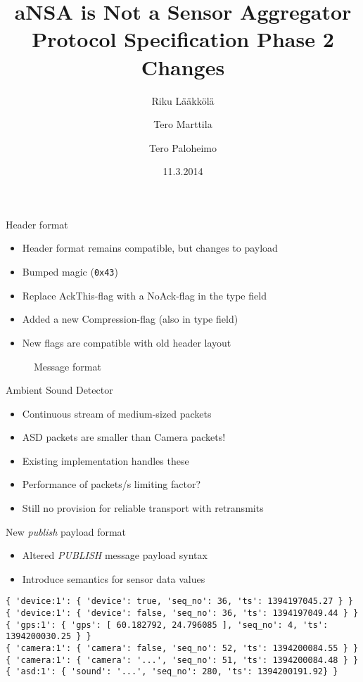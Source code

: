 \documentclass{beamer}
\title[SFO protocol]{aNSA is Not a Sensor Aggregator\\Protocol Specification Phase 2 Changes}
\author{Riku Lääkkölä \and Tero Marttila \and Tero Paloheimo}
\institute{Aalto ELEC}
\date{11.3.2014}
\begin{document}
\begin{frame}
\titlepage
\end{frame}

\begin{frame}{Header format}
\begin{itemize}
	\item Header format remains compatible, but changes to payload
	\item Bumped magic (\texttt{0x43})
	\item Replace AckThis-flag with a NoAck-flag in the type field
	\item Added a new Compression-flag (also in type field)
	\item New flags are compatible with old header layout
\end{itemize}

\begin{figure}
    \begin{center}
        {\tiny }
        \caption{Message format}
        \label{fig:header}
    \end{center}
\end{figure}

\end{frame}

\begin{frame}{Ambient Sound Detector}
\begin{itemize}
	\item Continuous stream of medium-sized packets
	\item ASD packets are smaller than Camera packets!
	\item Existing implementation handles these
	\item Performance of packets/s limiting factor?
	\item Still no provision for reliable transport with retransmits
\end{itemize}
\end{frame}

\begin{frame}[fragile]{New \emph{publish} payload format}
\begin{itemize}
	\item Altered \emph{PUBLISH} message payload syntax
	\item Introduce semantics for sensor data values
\end{itemize}
\scriptsize
\begin{verbatim}
{ 'device:1': { 'device': true, 'seq_no': 36, 'ts': 1394197045.27 } }
{ 'device:1': { 'device': false, 'seq_no': 36, 'ts': 1394197049.44 } }
{ 'gps:1': { 'gps': [ 60.182792, 24.796085 ], 'seq_no': 4, 'ts': 1394200030.25 } }
{ 'camera:1': { 'camera': false, 'seq_no': 52, 'ts': 1394200084.55 } }
{ 'camera:1': { 'camera': '...', 'seq_no': 51, 'ts': 1394200084.48 } }
{ 'asd:1': { 'sound': '...', 'seq_no': 280, 'ts': 1394200191.92} }
\end{verbatim}
\end{frame}
\end{document}
